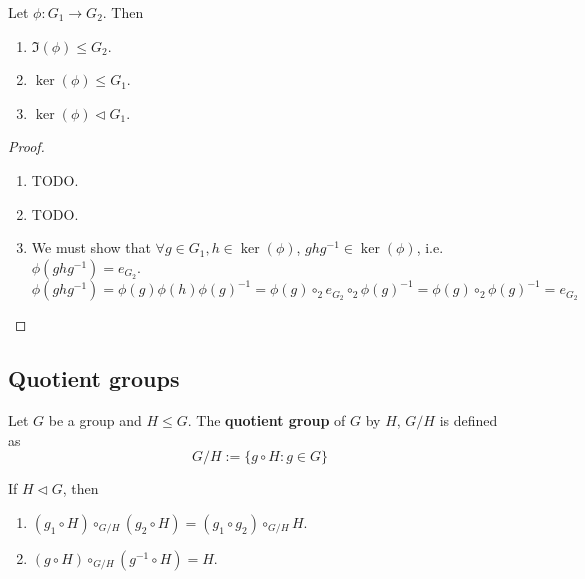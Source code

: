 \begin{proposition}
	Let $\phi: G_1 \rightarrow G_2$. Then
	\begin{enumerate}
		\item $\Im(\phi) \le G_2$.
		\item $\ker(\phi) \le G_1$.
		\item $\ker(\phi) \triangleleft G_1$.
	\end{enumerate}
\end{proposition}

\begin{proof}
	\hfill
	\begin{enumerate}
		\item TODO.
		\item TODO.
		\item We must show that $\forall g \in G_1, h \in \ker(\phi)$, $g h g^{-1} \in \ker(\phi)$, i.e. $\phi(g h g^{-1}) = e_{G_2}$.
		\[
			\phi(g h g^{-1}) = \phi(g) \phi(h) \phi(g)^{-1} = \phi(g) \circ_2 e_{G_2} \circ_2 \phi(g)^{-1} = \phi(g) \circ_2 \phi(g)^{-1} = e_{G_2}
		\]
	\end{enumerate}
\end{proof}

\subsection{Quotient groups}

\begin{definition}
	Let $G$ be a group and $H \le G$. The \textbf{quotient group} of $G$ by $H$, $G / H$ is defined as
	\[
		G / H := \{ g \circ H: g \in G \}
	\]
\end{definition}

\begin{proposition}
	If $H \triangleleft G$, then
	\begin{enumerate}
		\item $(g_1 \circ H) \circ_{G / H} (g_2 \circ H) = (g_1 \circ g_2) \circ_{G / H} H$.
		\item $(g \circ H) \circ_{G / H} (g^{-1} \circ H) = H$.
	\end{enumerate}
\end{proposition}


